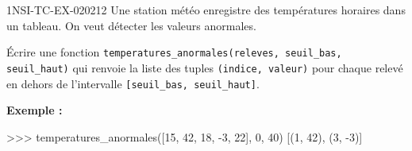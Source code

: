 \begin{exercice}{1NSI-TC-EX-020}{2}{12}
Une station météo enregistre des températures horaires dans un tableau. On veut
détecter les valeurs anormales.

Écrire une fonction \lstinline{temperatures_anormales(releves, seuil_bas, seuil_haut)}
qui renvoie la liste des tuples \lstinline{(indice, valeur)} pour chaque relevé en
dehors de l'intervalle \lstinline{[seuil_bas, seuil_haut]}.

\textbf{Exemple :}
\begin{console}
>>> temperatures_anormales([15, 42, 18, -3, 22], 0, 40)
[(1, 42), (3, -3)]
\end{console}
\end{exercice}
